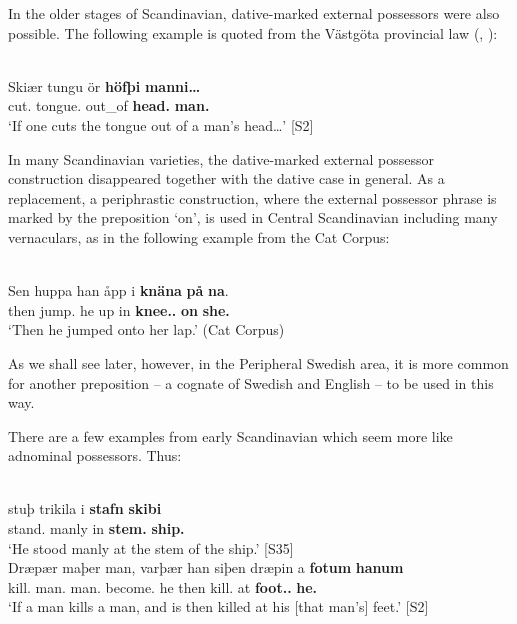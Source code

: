 In the older stages of Scandinavian, dative-marked external possessors were also possible. The following example is quoted from the Västgöta provincial law (\citealt[15]{Wessén1956}, \citealt[212]{Norde1997}): 

\ea%
\\
\gll Skiær  tungu  ör  \textbf{höfþi} \textbf{manni…}\\
cut.{\prs}  tongue.{\acc}  out\_of  \textbf{head.{\dat}} \textbf{man.{\dat}}\\
\glt ‘If one cuts the tongue out of a man’s head…’ [S2]
\z

In many Scandinavian varieties, the dative-marked external possessor construction disappeared together with the dative case in general. As a replacement, a periphrastic construction, where the external possessor phrase is marked by the preposition  ‘on’, is used in Central Scandinavian including many vernaculars, as in the following example from the Cat Corpus: 

\ea%
\\
\gll Sen  huppa  han  åpp  i  \textbf{knäna} \textbf{på} \textbf{na}.\\
then  jump.{\pst}  he  up  in  \textbf{knee.{}.{\pl}} \textbf{on} \textbf{she.{\obl}}\\
\glt ‘Then he jumped onto her lap.’ (Cat Corpus)
\z

As we shall see later, however, in the Peripheral Swedish area, it is more common for another preposition – a cognate of Swedish  and English  – to be used in this way.

There are a few examples from early Scandinavian which seem more like adnominal possessors. Thus:

\ea%
	\ea 
		\\
		\gll stuþ  trikila  i  \textbf{stafn} \textbf{skibi}\\
		stand.{\pst}  manly  in  \textbf{stem.{\dat}} \textbf{ship.{\dat}}\\
		\glt ‘He stood manly at the stem of the ship.’ [S35]
	\ex 
		\\
		\gll Dræpær  maþer  man, varþær  han  siþen  dræpin  a  \textbf{fotum} \textbf{hanum}\\
		kill.{\prs}  man.{\nom}  man.{\acc} become.{\prs}  he  then  kill.{\pp}  at  \textbf{foot.{\dat}.{\pl}} \textbf{he.{\dat}}\\
		\glt ‘If a man kills a man, and is then killed at his [that man’s] feet.’ [S2]
	\z 
\z

